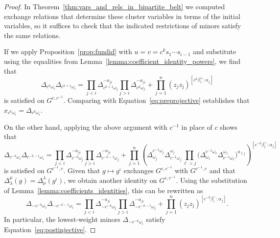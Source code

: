 \documentclass[12pt]{amsart}
\newcommand{\ol}[1]{\overline{#1}}
\theoremstyle{remark}
\numberwithin{equation}{section}
\numberwithin{figure}{section}
\begin{document}
\begin{proof}
  In Theorem~\ref{thm:vars_and_rels_in_bipartite_belt} we computed exchange relations that determine these cluster variables in terms of the initial variables, so it suffices to check that the indicated restrictions of minors satisfy the same relations.

  If we apply Proposition~\ref{prop:fundid} with $u = v = c^k s_1 \cdots s_{i-1}$ and substitute using the equalities from Lemma~\ref{lemma:coefficient_identity_powers}, we find that
  \begin{equation}
    \Delta_{c^k\omega_i}\Delta_{c^{k+1}\omega_i}
    =
    \prod_{j<i}\Delta_{c^{k+1}\omega_j}^{-a_{ji}}
    \prod_{j>i}\Delta_{c^k\omega_j}^{-a_{ji}}
    +
    \prod_{j=1}^n(z_j z_{\ol{\jmath}})^{[c^k\beta_i^+:\alpha_j]}
  \end{equation}
  is satisfied on $G^{c,c^{-1}}$.
  Comparing with Equation~\eqref{eq:preprojective} establishes that $x_{c^k\omega_i} = \Delta_{c^k \omega_i}$.

  On the other hand, applying the above argument with $c^{-1}$ in place of $c$ shows that
  \begin{equation*} \Delta_{c^{-k}\omega_i} \Delta_{c^{-k-1}\omega_i} =
    \prod_{j<i}\Delta_{c^{-k}\omega_j}^{-a_{ji}}
    \prod_{j>i}\Delta_{c^{-k-1}\omega_j}^{-a_{ji}}
    +
    \prod_{j=1}^n\left(
      \Delta^{c^{-1} \omega_j}_{\omega_j}
      \Delta^{\omega_j}_{ c^{-1}\omega_j}
      \prod_{\ell>j}\big(
        \Delta^{c^{-1} \omega_\ell}_{\omega_\ell}
        \Delta^{\omega_\ell}_{c^{-1} \omega_\ell}
      \big)^{a_{\ell j}}
    \right)^{[c^{-k}\beta_i^-:\alpha_j]}
  \end{equation*}
  is satisfied on $G^{c^{-1},c}$.
  Given that $g \mapsto g^\iota$ exchanges $G^{c,c^{-1}}$ with $G^{c^{-1},c}$ and that $\Delta_\lambda^\mu(g) = \Delta_\mu^\lambda(g^\iota)$, we obtain another identity on $G^{c,c^{-1}}$.
  Using the substitution of Lemma~\ref{lemma:coefficients_identities}, this can be rewritten as
  \begin{equation}
  \Delta_{-c^{-k}\omega_i}\Delta_{-c^{-k-1}\omega_i} =
    \prod_{j<i}\Delta_{-c^{-k}\omega_j}^{-a_{ji}}
    \prod_{j>i}\Delta_{-c^{-k-1}\omega_j}^{-a_{ji}}
    +
    \prod_{j=1}^n (z_j z_{\ol{\jmath}})^{[c^{-k}\beta_i^-:\alpha_j]}.
  \end{equation}
  In particular, the lowest-weight minors $\Delta_{-c^{-k}\omega_i}$ satisfy Equation~\eqref{eq:postinjective}.


\end{proof}
\end{document}
